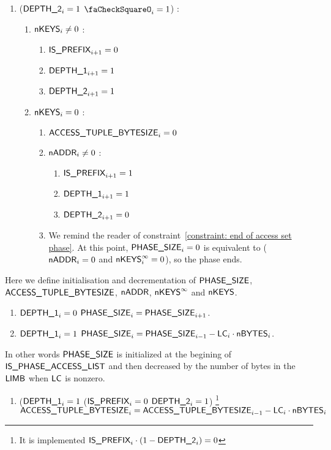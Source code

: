 \begin{enumerate}[resume]
	\item \If ($\textsf{DEPTH\_2}_{i}=1$ \et $\done_{i}=1$) \Then:
		\begin{enumerate}
			\item \If $\textsf{nKEYS}_{i} \ne 0$ \Then:
				\begin{enumerate}
					\item $\textsf{IS\_PREFIX}_{i+1}=0$  
					\item $\textsf{DEPTH\_1}_{i+1}=1$ 
					\item $\textsf{DEPTH\_2}_{i+1}=1$
				\end{enumerate}
			\item \If $\textsf{nKEYS}_{i}=0$ \Then:
				\begin{enumerate}
					\item $\textsf{ACCESS\_TUPLE\_BYTESIZE}_{i}=0$
					\item \If $\textsf{nADDR}_{i} \ne 0$ \Then:
						\begin{enumerate}
							\item $\textsf{IS\_PREFIX}_{i+1}=1$
							\item $\textsf{DEPTH\_1}_{i+1}=1$
							\item $\textsf{DEPTH\_2}_{i+1}=0$
						\end{enumerate}
					\item \trash We remind the reader of constraint~\ref{constraint: end of access set phase}. At this point, $\textsf{PHASE\_SIZE}_{i}=0$ is equivalent to ($\textsf{nADDR}_{i} = 0$ and $\textsf{nKEYS}^\infty_{i}=0$), so the phase ends.
				\end{enumerate} 
		\end{enumerate}
\end{enumerate}
Here we define initialisation and decrementation of $\textsf{PHASE\_SIZE}$, $\textsf{ACCESS\_TUPLE\_BYTESIZE}$, $\textsf{nADDR}$, $\textsf{nKEYS}^\infty$ and $\textsf{nKEYS}$.
\begin{enumerate}[resume]
	\item \If $\textsf{DEPTH\_1}_{i}=0$ \Then $\textsf{PHASE\_SIZE}_{i} = \textsf{PHASE\_SIZE}_{i+1}$.
	\item \If $\textsf{DEPTH\_1}_{i}=1$ \Then $\textsf{PHASE\_SIZE}_{i} = \textsf{PHASE\_SIZE}_{i-1} - \textsf{LC}_{i} \cdot \textsf{nBYTES}_{i}$. 
\end{enumerate}
In other words $\textsf{PHASE\_SIZE}$ is initialized at the begining of $\textsf{IS\_PHASE\_ACCESS\_LIST}{}$ and then decreased by the number of bytes in the $\textsf{LIMB}$ when $\textsf{LC}$ is nonzero.
\begin{enumerate}[resume]

	\item \If ($\textsf{DEPTH\_1}_{i}=1$ \et ($\textsf{IS\_PREFIX}_{i}=0$ \Or $\textsf{DEPTH\_2}_{i}=1$) \footnote{It is implemented \If $\textsf{IS\_PREFIX}_{i} \cdot (1 - \textsf{DEPTH\_2}_{i})=0$ \Then} \Then $\textsf{ACCESS\_TUPLE\_BYTESIZE}_{i}=\textsf{ACCESS\_TUPLE\_BYTESIZE}_{i-1} - \textsf{LC}_{i} \cdot \textsf{nBYTES}_{i}$

\end{enumerate}
